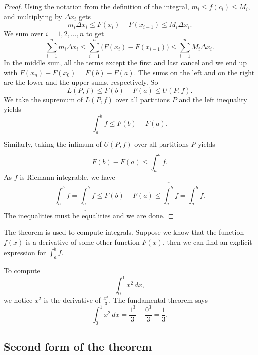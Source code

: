 \begin{proof}
Using the notation from the definition of the integral,
$m_i \leq f(c_i) \leq M_i$, and multiplying by $\Delta x_i$ gets
\begin{equation*}
m_i \Delta x_i \leq F(x_i) - F(x_{i-1}) \leq M_i \Delta x_i .
\end{equation*}
We sum over $i = 1,2, \ldots, n$ to get
\begin{equation*}
\sum_{i=1}^n m_i \Delta x_i
\leq \sum_{i=1}^n \bigl(F(x_i) - F(x_{i-1}) \bigr)
\leq \sum_{i=1}^n M_i \Delta x_i .
\end{equation*}
In the middle sum, all the terms except the first and last cancel 
and we end up with $F(x_n)-F(x_0) = F(b)-F(a)$.  The sums on the left
and on the right are the lower and the upper sums, respectively.  So
\begin{equation*}
L(P,f) \leq F(b)-F(a) \leq U(P,f) .
\end{equation*}
We take the supremum of $L(P,f)$ over all partitions $P$ and the left inequality
yields 
\begin{equation*}
\underline{\int_a^b} f \leq F(b)-F(a) .
\end{equation*}
Similarly, taking
the infimum of $U(P,f)$ over all partitions $P$ yields
\begin{equation*}
F(b)-F(a) \leq \overline{\int_a^b} f .
\end{equation*}
As $f$ is Riemann integrable, we have
\begin{equation*}
\int_a^b f =
\underline{\int_a^b} f \leq F(b)-F(a) \leq \overline{\int_a^b} f
= \int_a^b f .
\end{equation*}
The inequalities must be equalities and we are done.
\end{proof}

The theorem is used to compute integrals.  Suppose we know that
the function $f(x)$ is a derivative of some other function $F(x)$,
then we can find an explicit expression for $\int_a^b f$. 

\begin{example}
To compute
\begin{equation*}
\int_0^1 x^2 \,dx ,
\end{equation*}
we notice $x^2$ is the derivative of $\frac{x^3}{3}$.
The fundamental theorem says
\begin{equation*}
\int_0^1 x^2 \,dx =
\frac{1^3}{3}
-
\frac{0^3}{3}
= \frac{1}{3}.
\end{equation*}
\end{example}

\subsection{Second form of the theorem}

